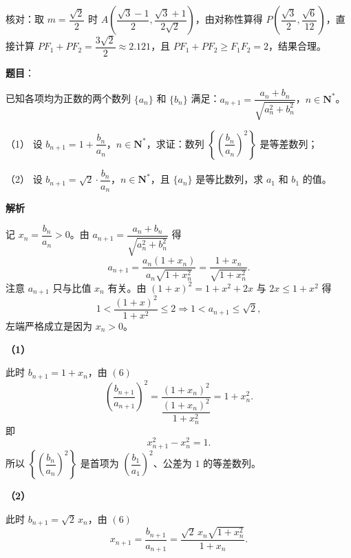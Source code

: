 \begin{answer}
核对：取 $m=\dfrac{\sqrt2}{2}$ 时 $A\left(\dfrac{\sqrt3-1}{2},\dfrac{\sqrt3+1}{2\sqrt2}\right)$，由对称性算得 $P\left(\dfrac{\sqrt3}{2},\dfrac{\sqrt6}{12}\right)$，直接计算 $PF_1+PF_2=\dfrac{3\sqrt2}{2}\approx2.121$，且 $PF_1+PF_2\geqslant F_1F_2=2$，结果合理。



\end{answer}
\begin{answer}

\textbf{题目}：

已知各项均为正数的两个数列 $\{a_n\}$ 和 $\{b_n\}$ 满足：$a_{n+1}=\dfrac{a_n+b_n}{\sqrt{a_n^2+b_n^2}}$，$n\in\mathbf N^*$。

（1） 设 $b_{n+1}=1+\dfrac{b_n}{a_n}$，$n\in\mathbf N^*$，求证：数列 $\left\{\left(\dfrac{b_n}{a_n}\right)^2\right\}$ 是等差数列；

（2） 设 $b_{n+1}=\sqrt2\cdot\dfrac{b_n}{a_n}$，$n\in\mathbf N^*$，且 $\{a_n\}$ 是等比数列，求 $a_1$ 和 $b_1$ 的值。

\textbf{解析}

记 $x_n=\dfrac{b_n}{a_n}>0$。由 $a_{n+1}=\dfrac{a_n+b_n}{\sqrt{a_n^2+b_n^2}}$ 得
\nopagebreak[4]
\[a_{n+1}=\frac{a_n\left(1+x_n\right)}{a_n\sqrt{1+x_n^2}}=\frac{1+x_n}{\sqrt{1+x_n^2}}. \tag{6}\]
注意 $a_{n+1}$ 只与比值 $x_n$ 有关。由 $(1+x)^2=1+x^2+2x$ 与 $2x\leqslant1+x^2$ 得
\nopagebreak[4]
\[1<\frac{(1+x)^2}{1+x^2}\leqslant2\Longrightarrow1<a_{n+1}\leqslant\sqrt2, \tag{7}\]
左端严格成立是因为 $x_n>0$。

\textbf{（1）}

此时 $b_{n+1}=1+x_n$，由 $(6)$
\nopagebreak[4]
\[\left(\frac{b_{n+1}}{a_{n+1}}\right)^2=\frac{(1+x_n)^2}{\dfrac{(1+x_n)^2}{1+x_n^2}}=1+x_n^2.\]
即
\nopagebreak[4]
\[x_{n+1}^2-x_n^2=1.\]
所以 $\left\{\left(\dfrac{b_n}{a_n}\right)^2\right\}$ 是首项为 $\left(\dfrac{b_1}{a_1}\right)^2$、公差为 $1$ 的等差数列。

\textbf{（2）}

此时 $b_{n+1}=\sqrt2\,x_n$，由 $(6)$
\nopagebreak[4]
\[x_{n+1}=\frac{b_{n+1}}{a_{n+1}}=\frac{\sqrt2\,x_n\sqrt{1+x_n^2}}{1+x_n}. \tag{8}\]


\end{answer}
